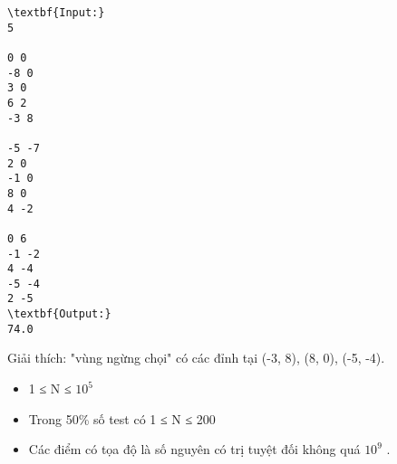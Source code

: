 \begin{verbatim}
\textbf{Input:}
5

0 0
-8 0
3 0
6 2
-3 8

-5 -7
2 0
-1 0
8 0
4 -2

0 6
-1 -2
4 -4
-5 -4
2 -5
\textbf{Output:}
74.0\end{verbatim}

Giải thích: "vùng ngừng chọi" có các đỉnh tại (-3, 8), (8, 0), (-5, -4).
\begin{itemize}
	\item     1 ≤ N ≤ $10^{5}$
	\item     Trong 50\% số test có 1 ≤ N ≤ 200   
	\item     Các điểm có tọa độ là số nguyên có trị tuyệt đối không quá $10^{9}$    .   
\end{itemize}